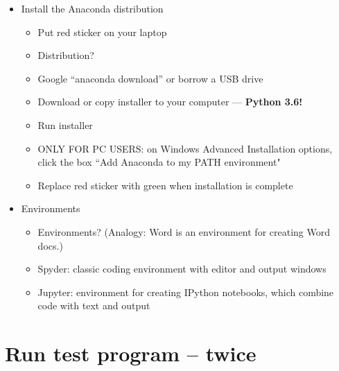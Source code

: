 \begin{itemize}
\item Install the Anaconda distribution
\begin{itemize}
\item Put red sticker on your laptop
\item Distribution?
\item Google ``anaconda download'' or borrow a USB drive
\item Download or copy installer to your computer --- {\bf Python 3.6!}
\item Run installer
\item ONLY FOR PC USERS: on Windows Advanced Installation options, click the box ``Add Anaconda to my PATH environment"
\item Replace red sticker with green when installation is complete
\end{itemize}

\item Environments
\begin{itemize}
\item Environments?  (Analogy:  Word is an environment for creating Word docs.)
\item Spyder:  classic coding environment with editor and output windows
\item Jupyter:  environment for creating IPython notebooks, which combine code with text and output
\end{itemize}
\end{itemize}



\section*{Run test program -- twice}

